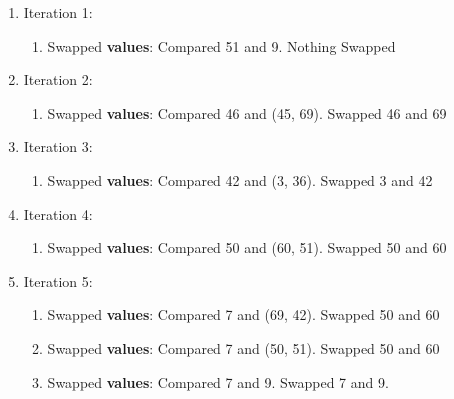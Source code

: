 \documentclass[11pt]{article}
\begin{document}
\begin{enumerate}

    \begin{enumerate}
        \item Iteration 1:
        \begin{enumerate}
            \item Swapped \textbf{values}: Compared 51 and 9. Nothing Swapped
        \end{enumerate}
        \item Iteration 2:
        \begin{enumerate}
            \item Swapped \textbf{values}: Compared 46 and (45, 69). Swapped 46 and 69
        \end{enumerate}
        \item Iteration 3:
        \begin{enumerate}
            \item Swapped \textbf{values}: Compared 42 and (3, 36). Swapped 3 and 42
        \end{enumerate}
        \item Iteration 4:
        \begin{enumerate}
            \item Swapped \textbf{values}: Compared 50 and (60, 51). Swapped 50 and 60
        \end{enumerate}
        \item Iteration 5:
        \begin{enumerate}
            \item Swapped \textbf{values}: Compared 7 and (69, 42). Swapped 50 and 60
            \item Swapped \textbf{values}: Compared 7 and (50, 51). Swapped 50 and 60
            \item Swapped \textbf{values}: Compared 7 and 9. Swapped 7 and 9.
        \end{enumerate}
    \end{enumerate}
    

\end{enumerate}
\end{document}

